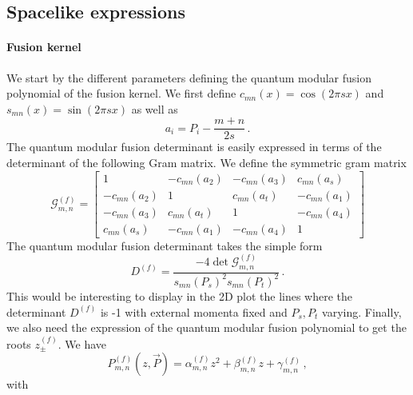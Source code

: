 \documentclass[11pt]{article}
\begin{document}
\subsection{Spacelike expressions}
\paragraph{Fusion kernel}
We start by the different parameters defining the quantum modular fusion polynomial of the fusion kernel. We first define $c_{mn}(x)=\cos(2\pi s x)$ and $s_{mn}(x)=\sin(2\pi s x)$ as well as 
\begin{equation}
    a_i=P_i-\frac{m+n}{2s}\,.
\end{equation}
The quantum modular fusion determinant is easily expressed in terms of the determinant of the following Gram matrix. We define the symmetric gram matrix
\begin{equation}
    \mathcal{G}^{(f)}_{m,n}=
    \begin{bmatrix}
    1 & -c_{mn}(a_2) & -c_{mn}(a_3) & c_{mn}(a_s) \\
    -c_{mn}(a_2) & 1 & c_{mn}(a_t) & -c_{mn}(a_1) \\
    -c_{mn}(a_3) & c_{mn}(a_t) & 1 & -c_{mn}(a_4) \\
    c_{mn}(a_s) & -c_{mn}(a_1) & -c_{mn}(a_4) & 1
    \end{bmatrix}
\end{equation}
The quantum modular fusion determinant takes the simple form 
\begin{equation}
    D^{(f)}=\frac{-4\det \mathcal{G}^{(f)}_{m,n}}{s_{mn}(P_s)^2 s_{mn}(P_t)^2}\,.
\end{equation}
This would be interesting to display in the 2D plot the lines where the determinant $D^{(f)}$ is -1 with external momenta fixed and $P_s, P_t$ varying. Finally, we also need the expression of the quantum modular fusion polynomial to get the roots $z_{\pm}^{(f)}$. We have
\begin{equation}
    P_{m,n}^{(f)}(z,\vec{P})=\alpha_{m,n}^{(f)}z^2+\beta_{m,n}^{(f)}z+\gamma_{m,n}^{(f)}\,,
\end{equation}
with
\end{document}

